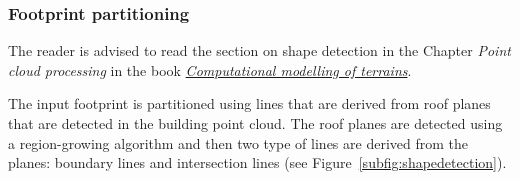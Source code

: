 \subsubsection{Footprint partitioning}
\begin{kaobox}[frametitle=\faExternalLink\ To read or to watch.]
		The reader is advised to read the section on shape detection in the Chapter \emph{Point cloud processing} in the book \href{https://github.com/tudelft3d/terrainbook/releases}{\emph{Computational modelling of terrains}}.
\end{kaobox}
The input footprint is partitioned using lines that are derived from roof planes that are detected in the building point cloud.
The roof planes are detected using a region-growing algorithm and then two type of lines are derived from the planes: boundary lines and intersection lines (see Figure~\ref{subfig:shapedetection}).
